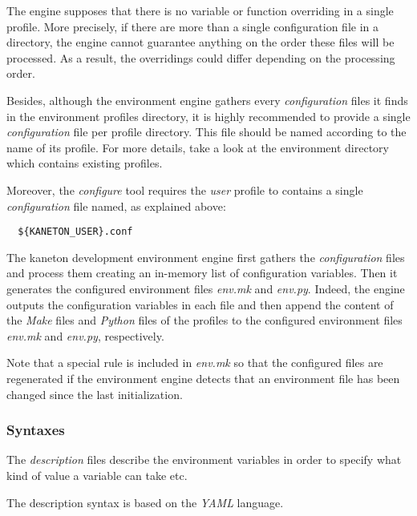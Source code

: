 The engine supposes that there is no variable or function overriding in
a single profile. More precisely, if there are more than a single
configuration file in a directory, the engine cannot guarantee anything
on the order these files will be processed. As a result, the overridings
could differ depending on the processing order.

Besides, although the environment engine gathers every \textit{configuration}
files it finds in the environment profiles directory, it is highly recommended
to provide a single \textit{configuration} file per profile directory. This
file should be named according to the name of its profile. For more details,
take a look at the environment directory which contains existing profiles.

Moreover, the \textit{configure} tool requires the \textit{user} profile to
contains a single \textit{configuration} file named, as explained above:

\begin{verbatim}
  ${KANETON_USER}.conf
\end{verbatim}

The kaneton development environment engine first gathers the
\textit{configuration} files and process them creating an in-memory list of
configuration variables. Then it generates the configured environment files
\textit{env.mk} and \textit{env.py}. Indeed, the engine outputs the
configuration variables in each file and then append the content of the
\textit{Make} files and \textit{Python} files of the profiles to the
configured environment files \textit{env.mk} and \textit{env.py}, respectively.

Note that a special rule is included in \textit{env.mk} so that the
configured files are regenerated if the environment engine detects that
an environment file has been changed since the last initialization.

%
%

\subsubsection{Syntaxes}



The \textit{description} files describe the environment variables in order
to specify what kind of value a variable can take etc.

The description syntax is based on the \textit{YAML} language.

